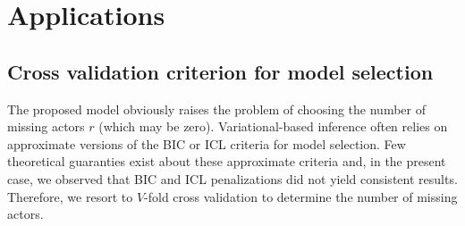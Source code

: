 \section{Applications}  \label{sec:Appli}


\subsection{Cross validation criterion for  model selection}
%

The proposed model obviously raises the problem of choosing the number of missing actors $r$ (which may be zero). Variational-based inference often relies on approximate versions of the BIC or ICL criteria for model selection. Few theoretical guaranties exist about these approximate criteria and, in the present case, we observed that BIC and ICL penalizations did not yield consistent results. Therefore, we resort to $V$-fold cross validation to determine the number of missing actors. 

